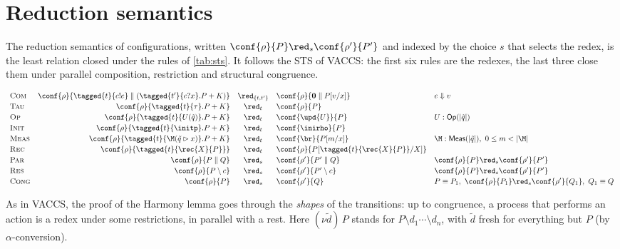 \section{Reduction semantics}

The reduction semantics of configurations, written
$\conf{\rho}{P} \red_{s} \conf{\rho'}{P'}$ and indexed by the choice $s$ that
selects the redex, is the least relation closed under the rules of
\cref{tab:sts}. It follows the STS of VACCS: the first six rules are the
redexes, the last three close them under parallel composition, restriction
and structural congruence.

\begin{table}[h]
\centering
\footnotesize
$\begin{array}{l@{\quad}rcl@{\quad}l}
\textsc{Com} &
  \conf{\rho}{\tagged{t}{c!e} \parallel (\tagged{t'}{c?x}.P + K)} &\red_{\{t,t'\}}&
  \conf{\rho}{\mathbf{0} \parallel P[v/x]} & e \Downarrow v \\[2pt]
\textsc{Tau} &
  \conf{\rho}{\tagged{t}{\tau}.P + K} &\red_{t}& \conf{\rho}{P} \\[2pt]
\textsc{Op} &
  \conf{\rho}{\tagged{t}{U(\tilde q)}.P + K} &\red_{t}&
  \conf{\upd{U}}{P} & U : \mathsf{Op}(|\tilde q|) \\[2pt]
\textsc{Init} &
  \conf{\rho}{\tagged{t}{\initp}.P + K} &\red_{t}&
  \conf{\inirho}{P} \\[2pt]
\textsc{Meas} &
  \conf{\rho}{\tagged{t}{\M(\tilde q \rhd x)}.P + K} &\red_{t}&
  \conf{\br}{P[m/x]} & \M : \mathsf{Meas}(|\tilde q|),\ 0 \le m < |\M| \\[2pt]
\textsc{Rec} &
  \conf{\rho}{\tagged{t}{\rec{X}{P}}} &\red_{t}&
  \conf{\rho}{P[\tagged{t}{\rec{X}{P}}/X]} \\[2pt]
\textsc{Par} &
  \conf{\rho}{P \parallel Q} &\red_{s}& \conf{\rho'}{P' \parallel Q}
  & \conf{\rho}{P} \red_{s} \conf{\rho'}{P'} \\[2pt]
\textsc{Res} &
  \conf{\rho}{P \setminus c} &\red_{s}& \conf{\rho'}{P' \setminus c}
  & \conf{\rho}{P} \red_{s} \conf{\rho'}{P'} \\[2pt]
\textsc{Cong} &
  \conf{\rho}{P} &\red_{s}& \conf{\rho'}{Q}
  & P \equiv P_1,\ \conf{\rho}{P_1} \red_{s} \conf{\rho'}{Q_1},\ Q_1 \equiv Q
\end{array}$
\caption{Reduction semantics of configurations.}
\label{tab:sts}
\end{table}

As in VACCS, the proof of the Harmony lemma goes through the \emph{shapes}
of the transitions: up to congruence, a process that performs an action is a
redex under some restrictions, in parallel with a rest. Here
$(\nu \tilde d)\,P$ stands for $P \setminus d_1 \cdots \setminus d_n$, with
$\tilde d$ fresh for everything but $P$ (by $\alpha$-conversion).

